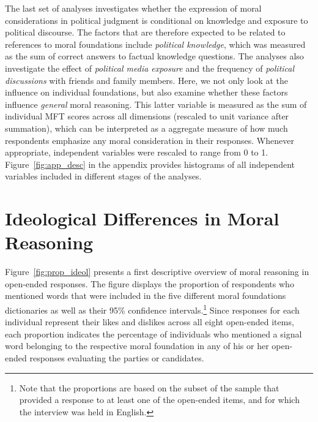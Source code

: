 \documentclass[12pt]{article}
\begin{document}
The last set of analyses investigates whether the expression of moral considerations in political judgment is conditional on knowledge and exposure to political discourse. The factors that are therefore expected to be related to references to moral foundations include \textit{political knowledge}, which was measured as the sum of correct answers to factual knowledge questions. The analyses also investigate the effect of \textit{political media exposure} and the frequency of \textit{political discussions} with friends and family members. Here, we not only look at the influence on individual foundations, but also examine whether these factors influence \textit{general} moral reasoning. This latter variable is measured as the sum of individual MFT scores across all dimensions (rescaled to unit variance after summation), which can be interpreted as a aggregate measure of how much respondents emphasize any moral consideration in their responses. Whenever appropriate, independent variables were rescaled to range from 0 to 1. Figure~\ref{fig:app_desc} in the appendix provides histograms of all independent variables included in different stages of the analyses.


\section*{Ideological Differences in Moral Reasoning}

Figure~\ref{fig:prop_ideol} presents a first descriptive overview of moral reasoning in open-ended responses. The figure displays the proportion of respondents who mentioned words that were included in the five different moral foundations dictionaries as well as their 95\% confidence intervals.\footnote{Note that the proportions are based on the subset of the sample that provided a response to at least one of the open-ended items, and for which the interview was held in English.} Since responses for each individual represent their likes and dislikes across all eight open-ended items, each proportion indicates the percentage of individuals who mentioned a signal word belonging to the respective moral foundation in any of his or her open-ended responses evaluating the parties or candidates.
\end{document}
